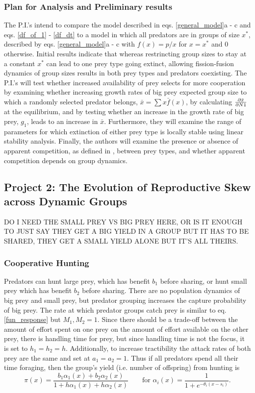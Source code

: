 \subsubsection{Plan for Analysis and Preliminary results}
The P.I.'s intend to compare the model described in eqs. \ref{general_model}a - c and eqs. \ref{df_of_1} - \ref{df_dt} to a model in which all predators are in groups of size $x^*$, described by eqs. \ref{general_model}a - c with $f(x) = p/x$ for $x = x^*$ and 0 otherwise. Initial results indicate that whereas restrincting group sizes to stay at a constant $x^*$ can lead to one prey type going extinct, allowing fission-fusion dynamics of group sizes results in both prey types and predators coexisting. The P.I.'s will test whether increased availability of prey selects for more cooperation by examining whether increasing growth rates of big prey expected group size to which a randomly selected predator belongs, $\bar{x} = \sum x \bar{f}(x)$,  by calculating $\pdv{\bar{x}}{N1}$ at the equilibrium, and by testing whether an increase in the growth rate of big prey, $g_1$, leads to an increase in $\bar{x}$. Furthermore, they will examine the range of parameters for which extinction of either prey type is locally stable using linear stability analysis. Finally, the authors will examine the presence or absence of apparent competition, as defined in \cite{holt_predation_1977}, between prey types, and whether apparent competition depends on group dynamics.



\subsection{Project 2: The Evolution of Reproductive Skew across Dynamic Groups}

DO I NEED THE SMALL PREY VS BIG PREY HERE, OR IS IT ENOUGH TO JUST SAY THEY GET A BIG YIELD IN A GROUP BUT IT HAS TO BE SHARED, THEY GET A SMALL YIELD ALONE BUT IT'S ALL THEIRS.
\subsubsection{Cooperative Hunting}
Predators can hunt large prey, which has benefit $b_1$ before sharing, or hunt small prey which has benefit $b_2$ before sharing. There are no population dynamics of big prey and small prey, but predator grouping increases the capture probability of big prey. The rate at which predator groups catch prey is similar to eq. \ref{fun_response} but $M_1, M_2 = 1$. Since there should be a trade-off between the amount of effort spent on one prey on the amount of effort available on the other prey, there is handling time for prey, but since handling time is not the focus, it is set to $h_1 = h_2 = h$. Additionally, to increase tractibility the attack rates of both prey are the same and set at $a_1 = a_2 = 1$. Thus if all predators spend all their time foraging, then the group's yield (i.e. number of offspring) from hunting is
\begin{equation} \label{fun_response_2}
\pi(x) = \frac{b_1 \alpha_1(x) + b_2 \alpha_2(x)}{1 +  h \alpha_1(x) + h \alpha_2(x)} \qquad \text{for }
\alpha_i(x) = \frac{1}{1 + e^{-\theta_i(x - s_i)}}.
\end{equation}
